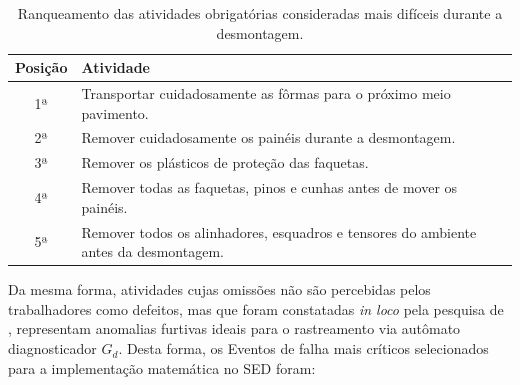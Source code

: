 \begin{table}[!htb]
	\centering
	\caption{Ranqueamento das atividades obrigatórias consideradas mais difíceis durante a desmontagem.}
	\label{tab:dificuldade_desmontagem}
	\begin{tabular}{cl}
		\hline
		\textbf{Posição} & \textbf{Atividade} \\
		\hline
		1ª & Transportar cuidadosamente as fôrmas para o próximo meio pavimento. \\
		2ª & Remover cuidadosamente os painéis durante a desmontagem. \\
		3ª & Remover os plásticos de proteção  das faquetas. \\
		4ª & Remover todas as faquetas, pinos e cunhas antes de mover os painéis. \\
		5ª & Remover todos os alinhadores, esquadros e tensores do ambiente antes da desmontagem. \\
		\hline
	\end{tabular}
\end{table}

Da mesma forma, atividades cujas omissões não são percebidas pelos trabalhadores como defeitos, mas que foram constatadas \textit{in loco} pela pesquisa de , representam anomalias furtivas ideais para o rastreamento via autômato diagnosticador $G_d$. Desta forma, os Eventos de falha mais críticos selecionados para a implementação matemática no SED foram:

